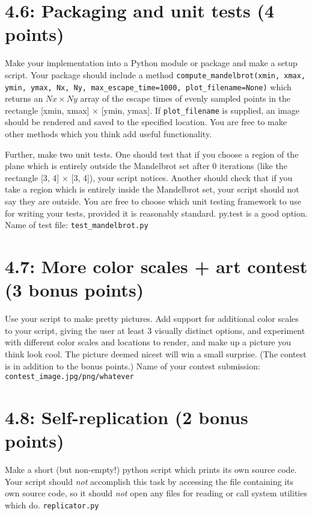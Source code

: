 \documentclass[english]{article}
\begin{document}
\section{4.6: Packaging and unit tests (4 points)}
Make your implementation into a Python module or package and make a setup script. Your package should include a method \texttt{compute\_mandelbrot(xmin, xmax, ymin, ymax, Nx, Ny, max\_escape\_time=1000, plot\_filename=None)} which returns an $Nx \times Ny$ array of the escape times of evenly sampled points in the rectangle [xmin, xmax] $\times$ [ymin, ymax]. If \texttt{plot\_filename} is supplied, an image should be rendered and saved to the specified location. You are free to make other methods which you think add useful functionality.

Further, make two unit tests. One should test that if you choose a region of the plane which is entirely outside the Mandelbrot set after 0 iterations (like the rectangle [3, 4] $\times$ [3, 4]), your script notices. Another should check that if you take a region which is entirely inside the Mandelbrot set, your script should not say they are outside. You are free to choose which unit testing framework to use for writing your tests, provided it is reasonably standard. py.test is a good option. 
\newline
Name of test file: \texttt{test\_mandelbrot.py}

\section{4.7: More color scales + art contest (3 bonus points)}
Use your script to make pretty pictures. Add support for additional color scales to your script, giving the user at least 3 visually distinct options, and experiment with different color scales and locations to render, and make up a picture you think look cool. The picture deemed nicest will win a small surprise. (The contest is in addition to the bonus points.)
\newline
Name of your contest submission: \texttt{contest\_image.jpg/png/whatever}

\section{4.8: Self-replication (2 bonus points)}
Make a short (but non-empty!) python script which prints its own source code. Your script should \emph{not}  accomplish this task by accessing the file containing its own source code, so it should \emph{not} open any files for reading or call system utilities which do. 
\newpage
\texttt{replicator.py}
\end{document}
